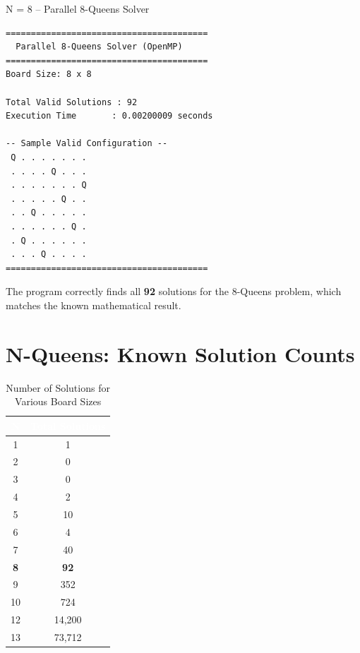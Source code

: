 \documentclass[11pt]{article}
\begin{document}
\begin{terminalbox}{N = 8 -- Parallel 8-Queens Solver}
\begin{lstlisting}[style=terminalstyle]
========================================
  Parallel 8-Queens Solver (OpenMP)
========================================
Board Size: 8 x 8

Total Valid Solutions : 92
Execution Time       : 0.00200009 seconds

-- Sample Valid Configuration --
 Q . . . . . . .
 . . . . Q . . .
 . . . . . . . Q
 . . . . . Q . .
 . . Q . . . . .
 . . . . . . Q .
 . Q . . . . . .
 . . . Q . . . .
========================================
\end{lstlisting}
\end{terminalbox}

The program correctly finds all \textbf{92} solutions for the 8-Queens problem, which matches the known mathematical result.

\section{N-Queens: Known Solution Counts}

\begin{table}[htbp]
\centering
\sffamily\small
\caption{Number of Solutions for Various Board Sizes}
\vspace{6pt}
\begin{tabular}{@{}cc@{}}
\toprule
\rowcolor{tableheader}
\textcolor{white}{\textbf{N}} & \textcolor{white}{\textbf{Total Solutions}} \\
\midrule
\rowcolor{rowalt}
1 & 1 \\
2 & 0 \\
\rowcolor{rowalt}
3 & 0 \\
4 & 2 \\
\rowcolor{rowalt}
5 & 10 \\
6 & 4 \\
\rowcolor{rowalt}
7 & 40 \\
\textbf{8} & \textbf{92} \\
\rowcolor{rowalt}
9 & 352 \\
10 & 724 \\
\rowcolor{rowalt}
12 & 14,200 \\
13 & 73,712 \\
\bottomrule
\end{tabular}
\end{table}
\end{document}
